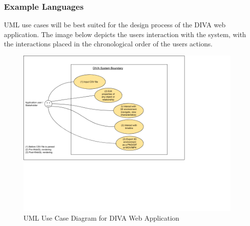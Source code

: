 \documentclass[journal,10pt,onecolumn,compsoc]{IEEEtran} \usepackage[margin=1.0in]{geometry} \usepackage{pdfpages}
\begin{document}
        \subsubsection{Example Languages}
        UML use cases will be best suited for the design process of the DIVA web application. The image below depicts the users interaction with the system, with the interactions placed in the chronological order of the users actions. 
            \begin{figure}[H]
                \centering
                    \caption{UML Use Case Diagram for DIVA Web Application}
                    \includegraphics[width=\linewidth]{UML_1.png}
            \end{figure}
            \vspace{-4cm}
            
    
\end{document}
